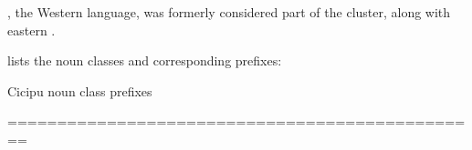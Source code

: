 \documentclass[output=paper]{langsci/langscibook}
\begin{document}
, the Western  language, was formerly considered part of the  cluster, along with eastern . 

 lists the  noun classes and corresponding prefixes:

\begin{table}
\caption{Cicipu noun class prefixes}
\label{tab:11}
\end{table}


================================================


\end{document}
